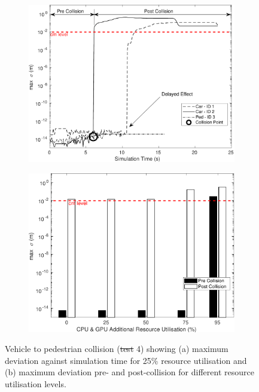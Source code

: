 \documentclass[letterpaper, 10 pt, journal, twoside]{IEEEtran}
\providecommand{\DIFaddtex}[1]{{\protect\color{blue}\uwave{#1}}} %
\providecommand{\DIFdeltex}[1]{{\protect\color{red}\sout{#1}}}                      %
\providecommand{\DIFaddFL}[1]{\DIFadd{#1}} %
\providecommand{\DIFdelFL}[1]{\DIFdel{#1}} %
\providecommand{\DIFaddbeginFL}{} %
\providecommand{\DIFaddendFL}{} %
\providecommand{\DIFdelbeginFL}{} %
\providecommand{\DIFdelendFL}{} %
\providecommand{\DIFadd}[1]{\texorpdfstring{\DIFaddtex{#1}}{#1}} %
\providecommand{\DIFdel}[1]{\texorpdfstring{\DIFdeltex{#1}}{}} %
\begin{document}
\begin{figure}[h]
    \centering
    \begin{subfigure}{.49\textwidth}
        \includegraphics[width=1\textwidth]{Other/Figures/CarsPeopleCollsionsCG25_V3.pdf}
        \caption{}
        \label{CarsPeopleCollsionsCG25}
    \end{subfigure}
    \begin{subfigure}{.49\textwidth}
        \includegraphics[width=1\textwidth]{Other/Figures/CarsPeopleCollisionPrePostV5.pdf}
        \caption{}
        \label{CarsPeopleCollisionPrePost}
    \end{subfigure}
    \caption{Vehicle to pedestrian collision (\DIFdelbeginFL \DIFdelFL{test }\DIFdelendFL \DIFaddbeginFL \DIFaddFL{Test }\DIFaddendFL 4) showing (a) maximum deviation against simulation time for 25\% resource utilisation and (b) maximum deviation pre- and post-collision for different resource utilisation levels.}
\end{figure}
\end{document}
